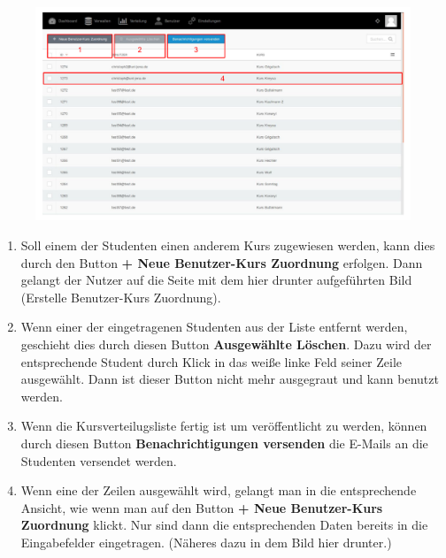   \begin{figure}
  	\centering
  	\includegraphics[scale=0.5]{backend/img/distribution_4.pdf}
  \end{figure}
  \begin{enumerate}
   \item Soll einem der Studenten einen anderem Kurs zugewiesen werden, kann dies durch den Button \textbf{+ Neue Benutzer-Kurs Zuordnung} erfolgen.
	 Dann gelangt der Nutzer auf die Seite mit dem hier drunter aufgeführten Bild (Erstelle Benutzer-Kurs Zuordnung).
   \item Wenn einer der eingetragenen Studenten aus der Liste entfernt werden, geschieht dies durch diesen Button \textbf{Ausgewählte Löschen}.
	 Dazu wird der entsprechende Student durch Klick in das weiße linke Feld seiner Zeile ausgewählt.
	 Dann ist dieser Button nicht mehr ausgegraut und kann benutzt werden.
   \item Wenn die Kursverteilugsliste fertig ist um veröffentlicht zu werden, 
	 können durch diesen Button \textbf{Benachrichtigungen versenden} die E-Mails an die Studenten versendet werden.
   \item Wenn eine der Zeilen ausgewählt wird, gelangt man in die entsprechende Ansicht, wie wenn man auf den Button \textbf{+ Neue Benutzer-Kurs Zuordnung} klickt.
	 Nur sind dann die entsprechenden Daten bereits in die Eingabefelder eingetragen. (Näheres dazu in dem Bild hier drunter.)
  \end{enumerate}

